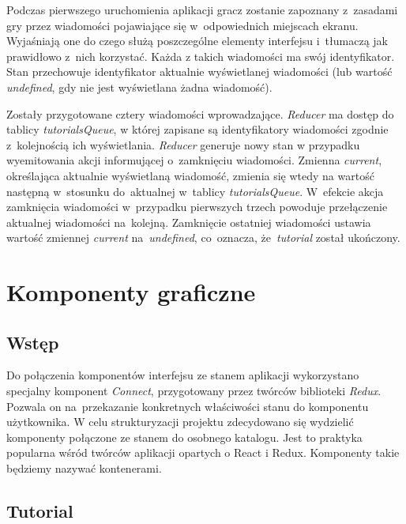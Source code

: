 \documentclass[12pt,a4paper,polish,thesis]{dcsbook}
\begin{document}
{	Podczas pierwszego uruchomienia aplikacji gracz zostanie zapoznany z~zasadami gry przez wiadomości pojawiające się w~odpowiednich miejscach ekranu. Wyjaśniają one do czego służą poszczególne elementy interfejsu i~tłumaczą jak prawidłowo z~nich korzystać. Każda z takich wiadomości ma swój identyfikator. Stan przechowuje identyfikator aktualnie wyświetlanej wiadomości (lub wartość \textit{undefined}, gdy nie jest wyświetlana żadna wiadomość).
	
	Zostały przygotowane cztery wiadomości wprowadzające. \textit{Reducer} ma dostęp do tablicy \textit{tutorialsQueue}, w której zapisane są identyfikatory wiadomości zgodnie z~kolejnością ich wyświetlania. \textit{Reducer} generuje nowy stan w przypadku wyemitowania akcji informującej o~zamknięciu wiadomości. Zmienna \textit{current}, określająca aktualnie wyświetlaną wiadomość, zmienia się wtedy na wartość następną w~stosunku do~aktualnej w~tablicy \textit{tutorialsQueue}. W~efekcie akcja zamknięcia wiadomości w~przypadku pierwszych trzech powoduje przełączenie aktualnej wiadomości na~kolejną. Zamknięcie ostatniej wiadomości ustawia wartość zmiennej \textit{current} na~\textit{undefined}, co~oznacza, że~\textit{tutorial} został ukończony.

	\section{Komponenty graficzne}

	\subsection{Wstęp}

	Do połączenia komponentów interfejsu ze stanem aplikacji wykorzystano specjalny komponent \textit{Connect}, przygotowany przez twórców biblioteki \textit{Redux}. Pozwala on na~przekazanie konkretnych właściwości stanu do komponentu użytkownika. W celu strukturyzacji projektu zdecydowano się wydzielić komponenty połączone ze stanem do osobnego katalogu. Jest to praktyka popularna wśród twórców aplikacji opartych o React i Redux. Komponenty takie będziemy nazywać kontenerami.

	\subsection{Tutorial}

}
\end{document}
